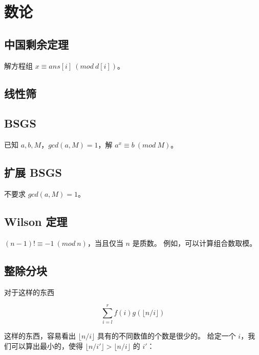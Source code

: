 \section{数论}

\subsection{中国剩余定理}

解方程组 $x \equiv ans[i] \ (mod \ d[i])$。



\subsection{线性筛}



\subsection{BSGS}

已知 $a, b, M$，$gcd(a, M) = 1$，解 $a^x \equiv b \ (mod \ M)$。



\subsection{扩展 BSGS}

不要求 $gcd(a, M) = 1$。



\subsection{Wilson 定理}

$(n-1)! \equiv -1 \ (mod \ n)$，当且仅当 $n$ 是质数。
例如，可以计算组合数取模。



\subsection{整除分块}

对于这样的东西

$$\sum_{i=l}^r f(i) g(\lfloor n/i \rfloor)$$

这样的东西，容易看出 $\lfloor n/i \rfloor$ 具有的不同数值的个数是很少的。
给定一个 $i$，我们可以算出最小的，使得 $\lfloor n/i' \rfloor >
\lfloor n/i \rfloor$ 的 $i'$：


